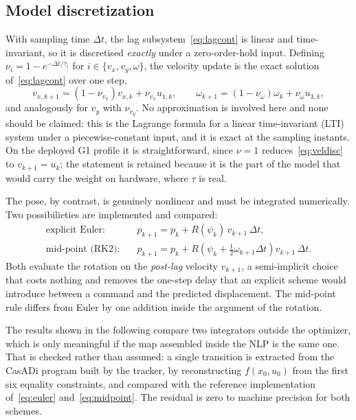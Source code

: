 \documentclass[11pt,a4paper]{article}
\begin{document}
\subsection{Model discretization}
\label{sec:discretization}

With sampling time $\Delta t$, the lag subsystem~\eqref{eq:lagcont} is linear and time-invariant, so it is
discretised \emph{exactly} under a zero-order-hold input. Defining
$\nu_i = 1-e^{-\Delta t/\tau_i}$ for $i\in\{v_x,v_y,\omega\}$, the velocity update is the
exact solution of~\eqref{eq:lagcont} over one step,
\begin{equation}
  v_{x,k+1}=(1-\nu_{v_x})v_{x,k}+\nu_{v_x} u_{1,k},\qquad
  \omega_{k+1}=(1-\nu_\omega)\omega_{k}+\nu_\omega u_{3,k},
  \label{eq:veldisc}
\end{equation}
and analogously for $v_y$ with $\nu_{v_y}$. No approximation is involved here and none should be claimed: this is the Lagrange
formula for a linear time-invariant (LTI) system under a piecewise-constant input, and it is exact at the sampling instants. On the
deployed G1 profile it is straightforward, since $\nu=1$ reduces~\eqref{eq:veldisc} to
$v_{k+1}=u_k$; the statement is retained because it is the part of the model that would carry the weight on hardware, where $\tau$ is real.

The pose, by contrast, is genuinely nonlinear and must be integrated numerically. Two possibilieties are implemented and compared:
\begin{align}
  \text{explicit Euler:}\quad & p_{k+1} = p_k + R(\psi_k)\,v_{k+1}\,\Delta t,
  \label{eq:euler}\\
  \text{mid-point (RK2):}\quad & p_{k+1} = p_k + R\!\left(\psi_k+\tfrac{1}{2}\omega_{k+1}\Delta t\right)v_{k+1}\,\Delta t.
  \label{eq:midpoint}
\end{align}
Both evaluate the rotation on the \emph{post-lag} velocity $v_{k+1}$, a semi-implicit choice that costs
nothing and removes the one-step delay that an explicit scheme would introduce between a command and the predicted
displacement. The mid-point rule differs from Euler by one addition inside the argument of the rotation.

The results shown in the following compare two integrators
outside the optimizer, which is only meaningful if the map assembled inside the NLP is the same one. That is
checked rather than assumed: a single transition is extracted from the CasADi program built by the tracker,
by reconstructing $f(x_0,u_0)$ from the first six equality constraints, and compared with the reference
implementation of~\eqref{eq:euler} and~\eqref{eq:midpoint}. The residual is zero to machine precision for both schemes.
\end{document}

